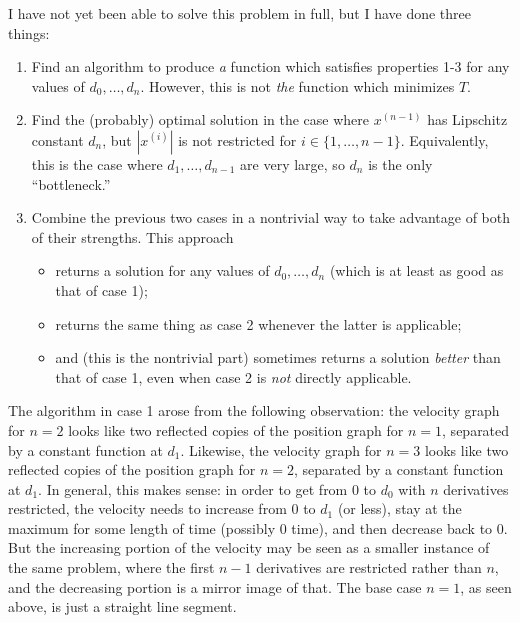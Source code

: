 \documentclass{article}
\newcommand{\abs}[1]{\left\vert #1 \right\vert}
\begin{document}
I have not yet been able to solve this problem in full,
but I have done three things:
\begin{enumerate}
  \item
    Find an algorithm to produce \textit{a} function
    which satisfies properties 1-3 for any values of $d_0, \ldots, d_n$.
    However, this is not \textit{the} function which minimizes $T$.
  \item
    Find the (probably) optimal solution
    in the case where $x^{(n-1)}$ has Lipschitz constant $d_n$,
    but $\abs{x^{(i)}}$ is not restricted for $i \in \{1, \ldots, n-1\}$.
    Equivalently, this is the case where $d_1, \ldots, d_{n-1}$ are very large,
    so $d_n$ is the only ``bottleneck.''
  \item
    Combine the previous two cases in a nontrivial way
    to take advantage of both of their strengths.
    This approach
    \begin{itemize}
    \item
      returns a solution for any values of $d_0, \ldots, d_n$
      (which is at least as good as that of case 1);
    \item
      returns the same thing as case 2 whenever the latter is applicable;
    \item
      and (this is the nontrivial part)
      sometimes returns a solution \textit{better} than that of case 1,
      even when case 2 is \textit{not} directly applicable.
    \end{itemize}
\end{enumerate}
The algorithm in case 1 arose from the following observation:
the velocity graph for $n=2$
looks like two reflected copies of the position graph for $n=1$,
separated by a constant function at $d_1$.
Likewise, the velocity graph for $n=3$
looks like two reflected copies of the position graph for $n=2$,
separated by a constant function at $d_1$.  
In general, this makes sense:
in order to get from $0$ to $d_0$ with $n$ derivatives restricted,
the velocity needs to increase from $0$ to $d_1$ (or less),
stay at the maximum for some length of time (possibly $0$ time),
and then decrease back to $0$.
But the increasing portion of the velocity
may be seen as a smaller instance of the same problem,
where the first $n-1$ derivatives are restricted rather than $n$,
and the decreasing portion is a mirror image of that.
The base case $n=1$, as seen above, is just a straight line segment.
\end{document}
